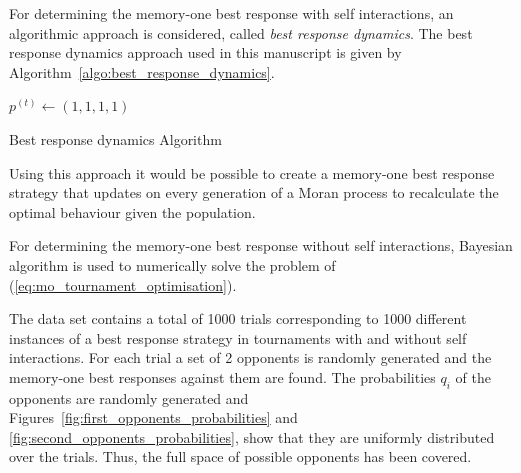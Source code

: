 For determining the memory-one best response with self interactions, an
algorithmic approach is considered, called \textit{best response dynamics}. The
best response dynamics approach used in this manuscript is given by
Algorithm~\ref{algo:best_response_dynamics}.

\begin{algorithm}[H]
    $p^{(t)}\leftarrow (1, 1, 1, 1)$\;
    \caption{Best response dynamics Algorithm}
    \label{algo:best_response_dynamics}
 \end{algorithm}

Using this approach it would be possible to create a memory-one best response
strategy that updates on every generation of a Moran process to recalculate the
optimal behaviour given the population.

For determining the memory-one best response without self interactions,
Bayesian algorithm is used to numerically solve the problem of
(\ref{eq:mo_tournament_optimisation}).

The data set contains
a total of 1000 trials corresponding to 1000 different instances of a best
response strategy in tournaments with and without self interactions. For each
trial a set of 2 opponents is randomly generated and the memory-one best
responses against them are found. The probabilities \(q_i\) of the opponents are
randomly generated and Figures~\ref{fig:first_opponents_probabilities} and
\ref{fig:second_opponents_probabilities}, show that they are uniformly
distributed over the trials. Thus, the full space of possible opponents has been
covered.

